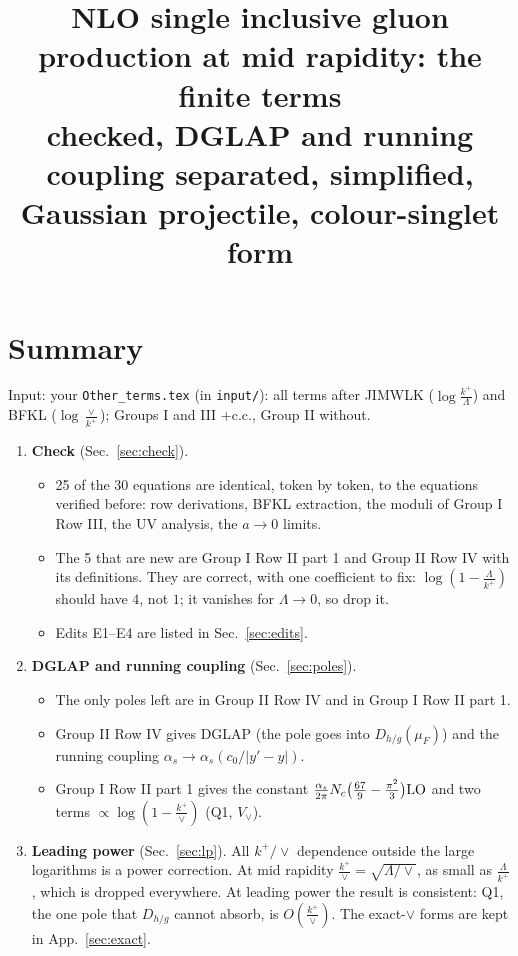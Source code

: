 \documentclass[10pt]{article}
\title{NLO single inclusive gluon production at mid rapidity: the finite terms\\[3pt]\large checked, DGLAP and running coupling separated, simplified, Gaussian projectile, colour-singlet form}
\date{}
\numberwithin{equation}{section}
\newcommand{\LO}{{\rm LO}}
\begin{document}
\maketitle
\tableofcontents

\section{Summary}\label{sec:summary}
Input: your \texttt{Other\_terms.tex} (in \texttt{input/}): all terms after JIMWLK ($\log\frac{k^+}{\Lambda}$) and BFKL ($\log\frac{\vee}{k^+}$); Groups I and III $+$c.c., Group II without.
\begin{enumerate}
\item \textbf{Check} (Sec.~\ref{sec:check}).
\begin{itemize}
\item 25 of the 30 equations are identical, token by token, to the equations verified before: row derivations, BFKL extraction, the moduli of Group I Row III, the UV analysis, the $a\to0$ limits.
\item The 5 that are new are Group I Row II part 1 and Group II Row IV with its definitions. They are correct, with one coefficient to fix: $\log(1-\frac{\Lambda}{k^+})$ should have $4$, not $1$; it vanishes for $\Lambda\to0$, so drop it.
\item Edits E1--E4 are listed in Sec.~\ref{sec:edits}.
\end{itemize}
\item \textbf{DGLAP and running coupling} (Sec.~\ref{sec:poles}).
\begin{itemize}
\item The only poles left are in Group II Row IV and in Group I Row II part 1.
\item Group II Row IV gives DGLAP (the pole goes into $D_{h/g}(\mu_F)$) and the running coupling $\alpha_s\to\alpha_s(c_0/|y'-y|)$.
\item Group I Row II part 1 gives the constant $\frac{\alpha_s}{2\pi}N_c\big(\frac{67}{9}-\frac{\pi^2}{3}\big)\LO$ and two terms $\propto\log(1-\frac{k^+}{\vee})$ (Q1, $V_\vee$).
\end{itemize}
\item \textbf{Leading power} (Sec.~\ref{sec:lp}). All $k^+/\vee$ dependence outside the large logarithms is a power correction. At mid rapidity $\frac{k^+}{\vee}=\sqrt{\Lambda/\vee}$, as small as $\frac{\Lambda}{k^+}$, which is dropped everywhere. At leading power the result is consistent: Q1, the one pole that $D_{h/g}$ cannot absorb, is $O(\frac{k^+}{\vee})$. The exact-$\vee$ forms are kept in App.~\ref{sec:exact}.

\end{enumerate}
\end{document}
